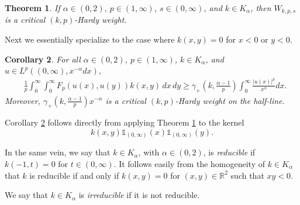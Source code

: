 \documentclass[12pt, a4paper]{amsart}
\newtheorem{theorem}{Theorem}[section]
\newtheorem{corollary}[theorem]{Corollary}
\newcommand*{\cyan}{\textcolor{cyan}}
\begin{document}
\begin{theorem}
\label{theorem: Hardy Inequality}
    If $\alpha \in (0, 2)$, $p \in (1, \infty)$, $s \in (0, \infty)$, and $k \in K_\alpha$, then
$W_{k, p, s}$ is a critical $(k, p)$-Hardy weight. 
\end{theorem}
Next we  essentially specialize to the case where $k(x,y)=0$ for $x<0$ or $y<0$.
\begin{corollary}\label{c.pnH} For all $\alpha \in (0, 2)$, $p \in (1, \infty)$, $k \in K_\alpha$, and $u \in L^p((0,\infty),x^{-\alpha}dx)$,
\begin{align}
\label{equation: pos -line}
    &\frac{1}{p}\int_{0}^{\infty}\int_{0}^{\infty}F_p(u(x), u(y))k(x, y)\,dx\,dy \geq \gamma_{+}\left(k, \frac{\alpha - 1}{p}\right)\int_{0}^{\infty}\frac{|u(x)|^p}{x^{\alpha}}dx.
\end{align}
Moreover, $\gamma_{+}\left(k, \frac{\alpha - 1}{p}\right)x^{-\alpha}$ is a critical $(k, p)$-Hardy weight on the half-line.
\end{corollary}
Corollary \cref{c.pnH} follows directly from applying Theorem \cref{theorem: Hardy Inequality} to the kernel $$k(x, y)\mathds{1}_{(0, \infty)}(x)\mathds{1}_{(0, \infty)}(y).$$


In the same vein, we say that \( k \in K_\alpha \), with \( \alpha \in (0, 2) \), is \emph{reducible} if \( k(-1, t) = 0 \) for  \( t \in (0, \infty) \). It follows easily from the homogeneity of \( k \in K_\alpha \) that \( k \) is reducible if and only if \( k(x, y) = 0 \) for  \( (x, y) \in \mathbb{R}^2 \) such that \( xy < 0 \). 

We say that \( k \in K_\alpha \) is \emph{irreducible} if it is not reducible.
\end{document}
